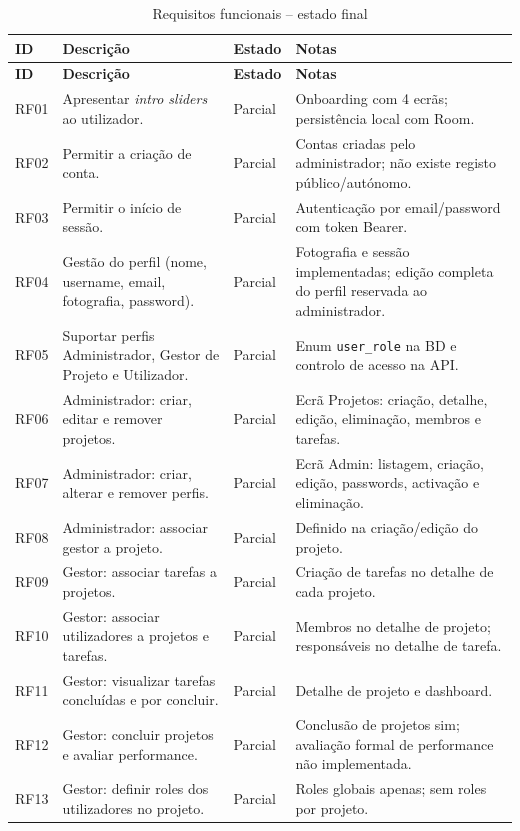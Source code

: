 \documentclass[12pt,a4paper]{article}
\begin{document}
\begin{longtable}{|p{1.2cm}|p{7.2cm}|p{2.2cm}|p{3.8cm}|}
\caption{Requisitos funcionais -- estado final}\label{tab:rf}\\
\hline
\textbf{ID} & \textbf{Descrição} & \textbf{Estado} & \textbf{Notas}\\
\hline
\endfirsthead
\hline
\textbf{ID} & \textbf{Descrição} & \textbf{Estado} & \textbf{Notas}\\
\hline
\endhead
RF01 & Apresentar \textit{intro sliders} ao utilizador. & Parcial & Onboarding com 4 ecrãs; persistência local com Room.\\
\hline
RF02 & Permitir a criação de conta. & Parcial & Contas criadas pelo administrador; não existe registo público/autónomo.\\
\hline
RF03 & Permitir o início de sessão. & Parcial & Autenticação por email/password com token Bearer.\\
\hline
RF04 & Gestão do perfil (nome, username, email, fotografia, password). & Parcial & Fotografia e sessão implementadas; edição completa do perfil reservada ao administrador.\\
\hline
RF05 & Suportar perfis Administrador, Gestor de Projeto e Utilizador. & Parcial & Enum \texttt{user\_role} na BD e controlo de acesso na API.\\
\hline
RF06 & Administrador: criar, editar e remover projetos. & Parcial & Ecrã Projetos: criação, detalhe, edição, eliminação, membros e tarefas.\\
\hline
RF07 & Administrador: criar, alterar e remover perfis. & Parcial & Ecrã Admin: listagem, criação, edição, passwords, activação e eliminação.\\
\hline
RF08 & Administrador: associar gestor a projeto. & Parcial & Definido na criação/edição do projeto.\\
\hline
RF09 & Gestor: associar tarefas a projetos. & Parcial & Criação de tarefas no detalhe de cada projeto.\\
\hline
RF10 & Gestor: associar utilizadores a projetos e tarefas. & Parcial & Membros no detalhe de projeto; responsáveis no detalhe de tarefa.\\
\hline
RF11 & Gestor: visualizar tarefas concluídas e por concluir. & Parcial & Detalhe de projeto e dashboard.\\
\hline
RF12 & Gestor: concluir projetos e avaliar performance. & Parcial & Conclusão de projetos sim; avaliação formal de performance não implementada.\\
\hline
RF13 & Gestor: definir roles dos utilizadores no projeto. & Parcial & Roles globais apenas; sem roles por projeto.\\

\end{longtable}
\end{document}
